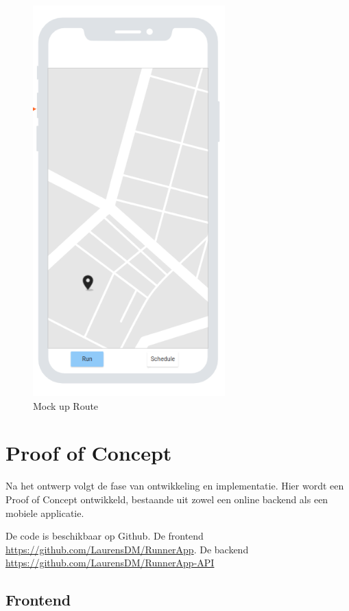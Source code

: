     \begin{figure}[htbp]
        \includegraphics[width=20em]{./graphics/route_Mockup.png}
        \centering
        \caption{Mock up Route}
        \label{fig:routeMockup}
    \end{figure}

    \pagebreak

    \section{Proof of Concept}

    Na het ontwerp volgt de fase van ontwikkeling en implementatie. Hier wordt een Proof of Concept ontwikkeld, 
    bestaande uit zowel een online backend als een mobiele applicatie.

    De code is beschikbaar op Github. 
    De frontend \url{https://github.com/LaurensDM/RunnerApp}.
    \vspace{2cm}
    De backend \url{https://github.com/LaurensDM/RunnerApp-API}

    \subsection{Frontend}

